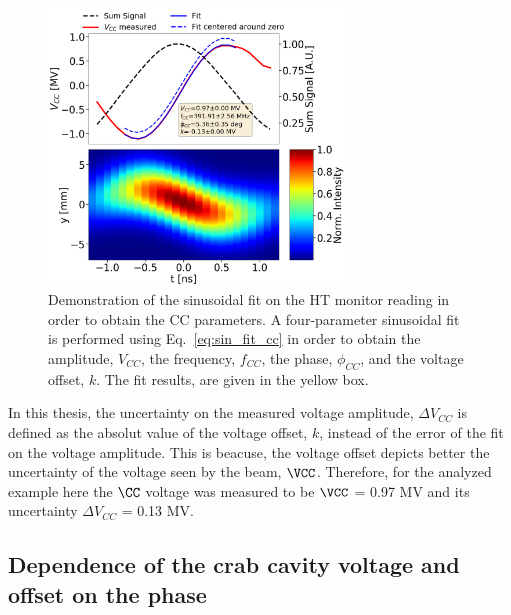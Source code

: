 \begin{figure}[!h]
   \centering         
   \includegraphics[width=0.7\textwidth]{images/Ch4/HT_VCC_callibration_20180530_135105_sin_fit.png}
       \caption{Demonstration of the sinusoidal fit on the HT monitor reading in order to obtain the CC parameters. A four-parameter sinusoidal fit is performed using Eq.~\eqref{eq:sin_fit_cc} in order to obtain the amplitude, $V_{CC}$, the frequency, $f_{CC}$, the phase, $\phi_{CC}$, and the voltage offset, $k$. The fit results, are given in the yellow box.}
       \label{fig:crabbing_sin_fit_MD2}
\end{figure}

In this thesis, the uncertainty on the measured voltage amplitude, $\Delta V_{CC}$ is defined as the absolut value of the voltage offset, $k$, instead of the error of the fit on the voltage amplitude. This is beacuse, the voltage offset depicts better the uncertainty of the voltage seen by the beam, $\VCC$. Therefore, for the analyzed example here the $\CC$ voltage was measured to be $\VCC$ = 0.97 MV and its uncertainty $\Delta V_{CC}$ = 0.13 MV. 




\subsection{Dependence of the crab cavity voltage and offset on the phase}

